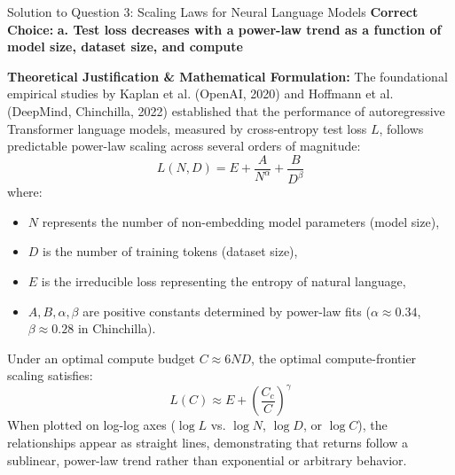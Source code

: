 \documentclass[11pt,a4paper]{article}
\begin{document}
\vspace{1.5em}

\begin{solutionbox}{Solution to Question 3: Scaling Laws for Neural Language Models}
\textbf{Correct Choice:} \textbf{a. Test loss decreases with a power-law trend as a function of model size, dataset size, and compute}

\medskip
\noindent
\textbf{Theoretical Justification \& Mathematical Formulation:}
The foundational empirical studies by Kaplan et al. (OpenAI, 2020) and Hoffmann et al. (DeepMind, Chinchilla, 2022) established that the performance of autoregressive Transformer language models, measured by cross-entropy test loss $L$, follows predictable power-law scaling across several orders of magnitude:
\begin{equation*}
    L(N, D) = E + \frac{A}{N^\alpha} + \frac{B}{D^\beta}
\end{equation*}
where:
\begin{itemize}[leftmargin=1.5em]
    \item $N$ represents the number of non-embedding model parameters (model size),
    \item $D$ is the number of training tokens (dataset size),
    \item $E$ is the irreducible loss representing the entropy of natural language,
    \item $A, B, \alpha, \beta$ are positive constants determined by power-law fits ($\alpha \approx 0.34$, $\beta \approx 0.28$ in Chinchilla).
\end{itemize}
Under an optimal compute budget $C \approx 6ND$, the optimal compute-frontier scaling satisfies:
\begin{equation*}
    L(C) \approx E + \left(\frac{C_c}{C}\right)^{\gamma}
\end{equation*}
When plotted on log-log axes ($\log L$ vs. $\log N$, $\log D$, or $\log C$), the relationships appear as straight lines, demonstrating that returns follow a sublinear, power-law trend rather than exponential or arbitrary behavior.


\end{solutionbox}
\end{document}
